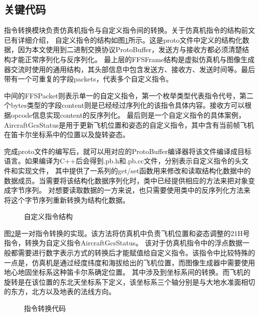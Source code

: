 \subsection{关键代码}
指令转换模块负责仿真机指令与自定义指令间的转换。关于仿真机指令的结构前文已有详细介绍，
自定义指令的结构如图\ref{protostruct}所示。这是proto文件中定义的结构化数据，因为本文使用到二进制交换协议ProtoBuffer，发送方与接收方都必须清楚结构才能正常序列化与反序列化。
最上层的FFSFrame结构是虚拟仿真机与图像生成器交流时使用的通用结构，其头部信息中包含发送方、接收方、发送时间等。最后带有一个可重复的字段packets，代表多个自定义指令。
\par
中间的FFSPacket则表示单一的自定义指令，第一个枚举类型代表指令代号，第二个bytes类型的字段content则是已经经过序列化的该指令具体内容。接收方可以根据opcode信息实现content的反序列化。
最后则是一个自定义指令的具体案例，AircraftGcsStatus是用于更新飞机位置和姿态的自定义指令，其中含有当前帧飞机在笛卡尔坐标系中的位置以及旋转姿态。
\par
完成proto文件的编写后，就可以用对应的ProtoBuffer编译器将该文件编译成目标语言。如果编译为C++后会得到.pb.h和.pb.cc文件，分别表示自定义指令的头文件和实现文件，
其中提供了一系列的get/set函数用来修改和读取结构化数据中的数据成员。当需要将该结构化数据序列化时，类中已经提供相应的方法来把对象变成字节序列。
对想要读取数据的一方来说，也只需要使用类中的反序列化方法来将这个字节序列重新转换为结构化数据。
\begin{figure}[h!]
    \begin{center}
        
        \caption{自定义指令结构}
        \label{protostruct}
    \end{center}
\end{figure}
\par
图\ref{21convert}是一对指令转换的实现。该方法将仿真机中负责飞机位置和姿态调整的21H号指令，转换为自定义指令AircraftGcsStatus。
该对于仿真机指令中的浮点数据一般都需要进行数字表示方式的转换后才能赋值给自定义指令。该指令中比较特殊的一点是，仿真机是通过经度纬度和海拔给出的飞机位置，而图像生成器中需要使用地心地固坐标系这种笛卡尔系确定位置。
其中涉及到坐标系间的转换。而飞机的旋转是在该位置的东北天坐标系下定义，该坐标系三个轴分别是与大地水准面相切的东方，北方以及地表的法线方向。
\begin{figure}[h!]
    \begin{center}
        
        \caption{指令转换代码}
        \label{21convert}
    \end{center}
\end{figure}
